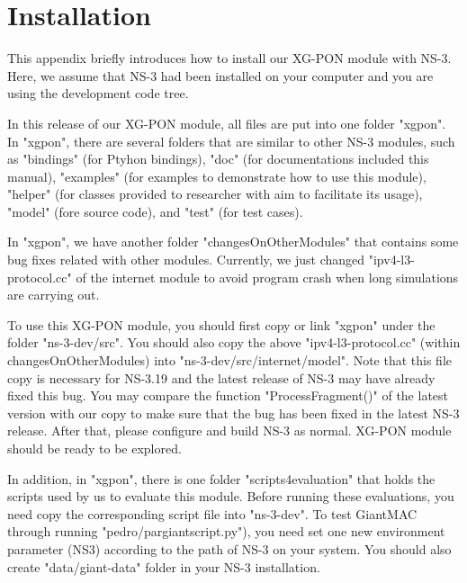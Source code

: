 \section{Installation}

This appendix briefly introduces how to install our XG-PON module
with NS-3. Here, we assume that NS-3 had been installed on your
computer and you are using the development code tree.

In this release of our XG-PON module, all files are put into one
folder "xgpon". In "xgpon", there are several folders that are
similar to other NS-3 modules, such as "bindings" (for Ptyhon
bindings), "doc" (for documentations included this manual),
"examples" (for examples to demonstrate how to use this module),
"helper" (for classes provided to researcher with aim to
facilitate its usage), "model" (fore source code), and "test" (for
test cases).

In "xgpon", we have another folder "changesOnOtherModules" that
contains some bug fixes related with other modules. Currently, we
just changed "ipv4-l3-protocol.cc" of the internet module to avoid
program crash when long simulations are carrying out.

To use this XG-PON module, you should first copy or link "xgpon" under
the folder "ns-3-dev/src". You should also copy
the above "ipv4-l3-protocol.cc" (within changesOnOtherModules) 
into "ns-3-dev/src/internet/model". Note that this file copy is necessary 
for NS-3.19 and the latest release of NS-3 may have already fixed this bug.
You may compare the function "ProcessFragment()" of the latest version 
with our copy to make sure that the bug has been fixed in the latest NS-3 release.
After that, please configure and build NS-3 as normal. XG-PON module
should be ready to be explored.

In addition, in "xgpon", there is one folder "scripts4evaluation"
that holds the scripts used by us to evaluate this module. Before
running these evaluations, you need copy the corresponding script
file into "ns-3-dev". To test GiantMAC through running 
"pedro/pargiantscript.py"), you need set one new environment
parameter (NS3) according to the path of NS-3 on your system. 
You should also create "data/giant-data" folder in your NS-3
installation.
